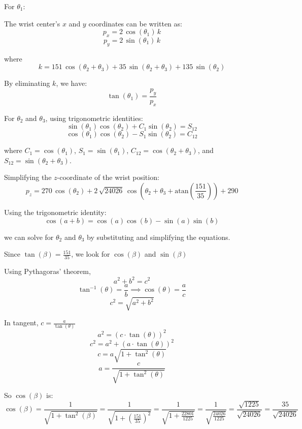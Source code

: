 \noindent For \(\theta_1\):

The wrist center's \(x\) and \(y\) coordinates can be written as:
\[
  p_x = 2\,\cos(\theta_1)\,k
\]
\[
  p_y = 2\,\sin(\theta_1)\,k
\]

where
\[
  k = 151\,\cos(\theta_2 + \theta_3) + 35\,\sin(\theta_2 + \theta_3) + 135\,\sin(\theta_2)
\]

By eliminating \(k\), we have:
\[
  \tan(\theta_1) = \frac{p_y}{p_x}
\]

\begin{center}
\end{center}


\noindent For \(\theta_2\) and \(\theta_3\), using trigonometric identities:
\[
  \sin(\theta_1)\cos(\theta_2) + C_1\sin(\theta_2) = S_{12}
\]
\[
  \cos(\theta_1)\cos(\theta_2) - S_1\sin(\theta_2) = C_{12}
\]

where \(C_1 = \cos(\theta_1)\), \(S_1 = \sin(\theta_1)\), \(C_{12} = \cos(\theta_2 + \theta_3)\), and \(S_{12} = \sin(\theta_2 + \theta_3)\).

\noindent Simplifying the \(z\)-coordinate of the wrist position:
\[
  p_z = 270\,\cos(\theta_2) + 2\,\sqrt{24026}\,\cos\left(\theta_2 + \theta_3 + \mathrm{atan}\left(\frac{151}{35}\right)\right) + 290
\]




Using the trigonometric identity:
\[
  \cos(a + b) = \cos(a)\cos(b) - \sin(a)\sin(b)
\]

we can solve for \(\theta_2\) and \(\theta_3\) by substituting and simplifying the equations.

\noindent Since \(\tan (\beta) = \frac{151}{35}\), we look for \(\cos (\beta)\) and \(\sin (\beta)\)

Using Pythagoras' theorem,
\[
  a^2 + b^2 = c^2
\]
\[
  \tan^{-1}(\theta) = \frac{a}{b} \implies \cos (\theta) = \frac{a}{c}
\]
\[
  c^2 = \sqrt{a^2 + b^2}
\]

In tangent, \(c = \frac{a}{\tan (\theta)}\)
\[
  a^2 = (c \cdot \tan (\theta))^2
\]
\[
  c^2 = a^2 + (a \cdot \tan (\theta))^2
\]
\[
  c = a \sqrt{1 + \tan^2 (\theta)}
\]
\[
  a = \frac{c}{\sqrt{1 + \tan^2 (\theta)}}
\]

So \(\cos (\beta)\) is:
\[
  \cos (\beta) = \frac{1}{\sqrt{1 + \tan^2 (\beta)}} = \frac{1}{\sqrt{1 + \left( \frac{151}{35} \right)^2}} = \frac{1}{\sqrt{1 + \frac{22801}{1225}}} = \frac{1}{\sqrt{\frac{24026}{1225}}} = \frac{\sqrt{1225}}{\sqrt{24026}} = \frac{35}{\sqrt{24026}}
\]





